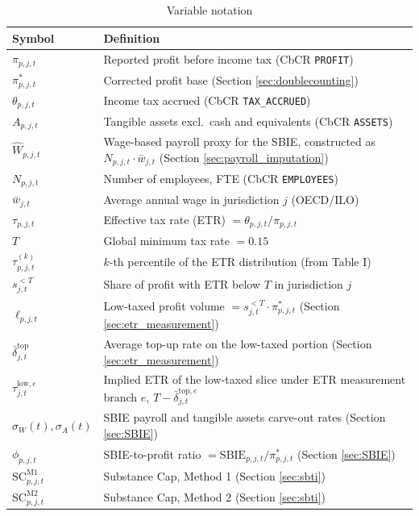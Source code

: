 \documentclass[11pt,a4paper]{article}
\newcommand{\code}[1]{\texttt{#1}}
\begin{document}
\begin{table}[H]
\centering
\caption{Variable notation}
\label{tab:notation}
\small
\begin{tabular}{@{}ll@{}}
\toprule
Symbol & Definition \\
\midrule
$\pi_{p,j,t}$ & Reported profit before income tax (CbCR \code{PROFIT}) \\
$\pi_{p,j,t}^{*}$ & Corrected profit base (Section \ref{sec:doublecounting}) \\
$\theta_{p,j,t}$ & Income tax accrued (CbCR \code{TAX\_ACCRUED}) \\
$A_{p,j,t}$ & Tangible assets excl.\ cash and equivalents (CbCR \code{ASSETS}) \\
$\hat{W}_{p,j,t}$ & Wage-based payroll proxy for the SBIE, constructed as $N_{p,j,t} \cdot \bar{w}_{j,t}$ (Section \ref{sec:payroll_imputation}) \\
$N_{p,j,t}$ & Number of employees, FTE (CbCR \code{EMPLOYEES}) \\
$\bar{w}_{j,t}$ & Average annual wage in jurisdiction $j$ (OECD/ILO) \\
$\tau_{p,j,t}$ & Effective tax rate (ETR) $= \theta_{p,j,t} / \pi_{p,j,t}$ \\
$T$ & Global minimum tax rate $= 0.15$ \\
$\tau_{p,j,t}^{(k)}$ & $k$-th percentile of the ETR distribution (from Table I) \\
$s_{j,t}^{<T}$ & Share of profit with ETR below $T$ in jurisdiction $j$ \\
$\ell_{p,j,t}$ & Low-taxed profit volume $= s_{j,t}^{<T} \cdot \pi_{p,j,t}^{*}$ (Section \ref{sec:etr_measurement}) \\
$\bar{\delta}_{j,t}^{\text{top}}$ & Average top-up rate on the low-taxed portion (Section \ref{sec:etr_measurement}) \\
$\tau_{j,t}^{\text{low},e}$ & Implied ETR of the low-taxed slice under ETR measurement branch $e$, $T-\bar{\delta}_{j,t}^{\text{top},e}$ \\
$\sigma_W(t), \sigma_A(t)$ & SBIE payroll and tangible assets carve-out rates (Section \ref{sec:SBIE}) \\
$\phi_{p,j,t}$ & SBIE-to-profit ratio $= \text{SBIE}_{p,j,t} / \pi_{p,j,t}^{*}$ (Section \ref{sec:SBIE}) \\
$\text{SC}_{p,j,t}^{\text{M1}}$ & Substance Cap, Method 1 (Section \ref{sec:sbti}) \\
$\text{SC}_{p,j,t}^{\text{M2}}$ & Substance Cap, Method 2 (Section \ref{sec:sbti}) \\

\end{tabular}
\end{table}
\end{document}
